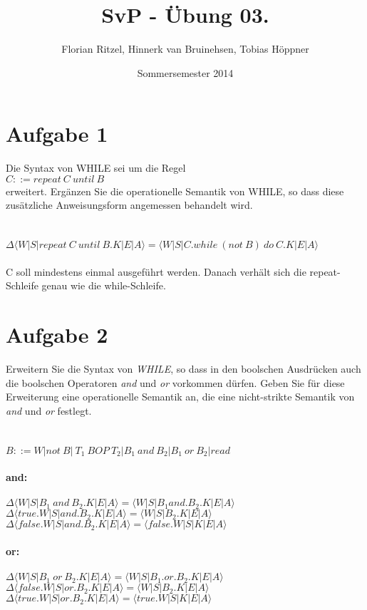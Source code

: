 \documentclass[ngerman,a4paper]{report}
\author{Florian Ritzel, Hinnerk van Bruinehsen, Tobias Höppner}
\title{SvP - Übung 03. }
\date{Sommersemester 2014}
\renewcommand{\maketitle}{}
\begin{document}
 
\maketitle 
\section*{Aufgabe 1}
Die Syntax von WHILE sei um die Regel\\
$C::= repeat\ C\ until\ B$\\
erweitert. Ergänzen Sie die operationelle Semantik von WHILE, so dass diese zusätzliche Anweisungsform angemessen behandelt wird.\\\\\\
$\Delta\langle W|S|repeat\ C\ until\ B.K|E|A\rangle = \langle W|S|C.while\ (not\ B)\ do\ C.K|E|A\rangle$\\\\
C soll mindestens einmal ausgeführt werden. Danach verhält sich die repeat-Schleife genau wie die while-Schleife.

\section*{Aufgabe 2}

Erweitern Sie die Syntax von \emph{WHILE}, so dass in den boolschen Ausdrücken auch die boolschen Operatoren \textit{and} und \textit{or} vorkommen dürfen. Geben Sie für diese Erweiterung eine operationelle Semantik an, die eine nicht-strikte Semantik von \textit{and} und \textit{or} festlegt.\\\\\\
$B::=W|not\ B|\ T_1\ BOP\ T_2| B_1\ and\  B_2| B_1\ or\ B_2| read$\\\\
\textbf{and:}\\\\
$\Delta\langle W|S|B_1\ and\ B_2.K|E|A\rangle = \langle W|S|B_1 and.B_2.K|E|A\rangle$\\
$\Delta\langle true.W|S|and.B_2.K|E|A\rangle = \langle W|S|B_2.K|E|A\rangle$\\
$\Delta\langle false.W|S|and.B_2.K|E|A\rangle = \langle false.W|S|K|E|A\rangle$\\\\
\textbf{or:}\\\\
$\Delta\langle W|S|B_1\ or\ B_2.K|E|A\rangle = \langle W|S|B_1.or.B_2.K|E|A\rangle$\\
$\Delta\langle false.W|S|or.B_2.K|E|A\rangle = \langle W|S|B_2.K|E|A\rangle$\\
$\Delta\langle true.W|S|or.B_2.K|E|A\rangle = \langle true.W|S|K|E|A\rangle$\\
\end{document}
